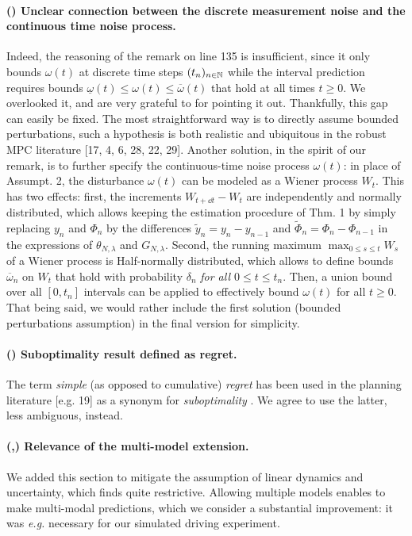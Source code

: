 \documentclass{article}
\begin{document}
\paragraph{() Unclear connection between the discrete measurement noise and the continuous time noise process.}  Indeed, the reasoning of the remark on line 135 is insufficient, since it only bounds $\omega(t)$ at discrete time steps $(t_n)_{n\in\mathbb{N}}$ while the interval prediction requires bounds $\underline{\omega}(t)\leq\omega(t)\leq\overline{\omega}(t)$ that hold at all times $t\geq 0$. We overlooked it, and are very grateful to  for pointing it out. Thankfully, this gap can easily be fixed. The most straightforward way is to directly assume bounded perturbations, such a hypothesis is both realistic and ubiquitous in the robust MPC literature [17, 4, 6, 28, 22, 29]. Another solution, in the spirit of our remark, is to further specify the continuous-time noise process $\omega(t)$: in place of Assumpt. 2, the disturbance $\omega(t)$ can be modeled as a Wiener process $W_t$. This has two effects: first, the increments $W_{t+\dd t} - W_t$ are independently and normally distributed, which allows keeping the estimation procedure of Thm. 1 by simply replacing $y_n$ and $\Phi_n$ by the differences $\tilde{y}_n = y_n-y_{n-1}$ and $\tilde{\Phi}_n = \Phi_n-\Phi_{n-1}$ in the expressions of $\theta_{N,\lambda}$ and $G_{N,\lambda}$. Second, the running maximum $\max_{0\leq s\leq t} W_s$ of a Wiener process is Half-normally distributed, which allows to define bounds $\overline{\omega}_n$ on $W_t$ that hold with probability $\delta_n$ \emph{for all $0\leq t\leq t_n$}. Then, a union bound over all $[0,t_{n}]$ intervals can be applied to effectively bound $\omega(t)$ for all $t\geq 0$. That being said, we would rather include the first solution (bounded perturbations assumption) in the final version for simplicity.

\paragraph{() Suboptimality result defined as regret.} The term \textit{simple} (as opposed to cumulative) \textit{regret} has been used in the planning literature [e.g. 19] as a synonym for \textit{suboptimality} . We agree to use the latter, less ambiguous, instead.

\paragraph{(,) Relevance of the multi-model extension.}
We added this section to mitigate the assumption of linear dynamics and uncertainty, which  finds quite restrictive. Allowing multiple models enables to make multi-modal predictions, which we consider a substantial improvement: it was \textit{e.g.} necessary for our simulated driving experiment.
\end{document}
